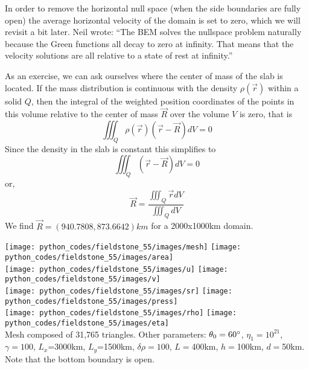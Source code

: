 In order to remove the horizontal null space (when the side boundaries are fully open) 
the average horizontal velocity of the domain is set to zero,
which we will revisit a bit later. Neil wrote: ``The BEM 
solves the nullspace problem naturally because the Green functions
all decay to zero at infinity. That means that the velocity solutions 
are all relative to a state of rest at infinity.''

As an exercise, we can ask ourselves where the center of mass of the slab is located.
If the mass distribution is continuous with the density $\rho(\vec{r})$ 
within a solid $Q$, then the integral of the weighted position coordinates 
of the points in this volume relative to the center of mass $\vec{R}$ over the volume $V$ is zero, 
that is
\[
\iiint_Q \rho(\vec{r}) (\vec{r}-\vec{R}) dV =0
\]
Since the density in the slab is constant this simplifies to 
\[
\iiint_Q  (\vec{r}-\vec{R}) dV =0
\]
or, 
\[
\vec{R} = \frac{ \iiint_Q  \vec{r} dV}{\iiint_Q  dV}
\]
We find $\vec{R}=(940.7808, 873.6642)km$ for a 2000x1000km domain.




\begin{center}
\texttt{[image: python\_codes/fieldstone\_55/images/mesh]}
\texttt{[image: python\_codes/fieldstone\_55/images/area]}\\
\texttt{[image: python\_codes/fieldstone\_55/images/u]}
\texttt{[image: python\_codes/fieldstone\_55/images/v]}\\
\texttt{[image: python\_codes/fieldstone\_55/images/sr]}
\texttt{[image: python\_codes/fieldstone\_55/images/press]}\\
\texttt{[image: python\_codes/fieldstone\_55/images/rho]}
\texttt{[image: python\_codes/fieldstone\_55/images/eta]}\\
{\captionfont Mesh composed of 31,765 triangles.
Other parameters: $\theta_0=60\degree$, $\eta_1=10^{21}$, $\gamma=100$, 
$L_x$=3000km, $L_y$=1500km, $\delta\rho=100$, $L=$400km, $h=$100km, $d=$50km. 
Note that the bottom boundary is open.}
\end{center}


